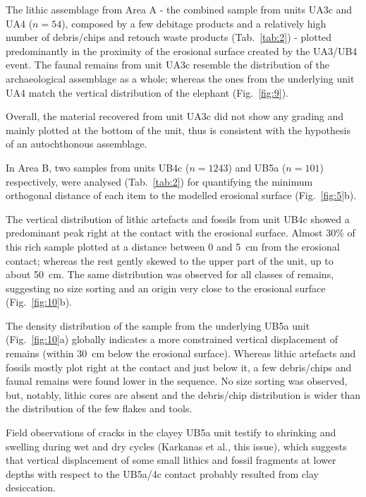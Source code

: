 \documentclass[preprint,authoryear,times]{elsarticle} %
\begin{document}
The lithic assemblage from Area A - the combined sample from units UA3c and UA4 ($n = 54$), composed by a few debitage products and a relatively high number of debris/chips and retouch waste products (Tab.~\ref{tab:2}) - plotted predominantly in the proximity of the erosional surface created by the UA3/UB4 event. The faunal remains from unit UA3c resemble the distribution of the archaeological assemblage as a whole; whereas the ones from the underlying unit UA4 match the vertical distribution of the elephant (Fig.~\ref{fig:9}).

Overall, the material recovered from unit UA3c did not show any grading and mainly plotted at the bottom of the unit, thus is consistent with the hypothesis of an autochthonous assemblage.


In Area B, two samples from units UB4c ($n = 1243$) and UB5a ($n = 101$) respectively, were analysed (Tab.~\ref{tab:2}) for quantifying the minimum orthogonal distance of each item to the modelled erosional surface (Fig.~\ref{fig:5}b).

The vertical distribution of lithic artefacts and fossils from unit UB4c showed a predominant peak right at the contact with the erosional surface. Almost 30\% of this rich sample plotted at a distance between 0 and 5~cm from the erosional contact; whereas the rest gently skewed to the upper part of the unit, up to about 50~cm. The same distribution was observed for all classes of remains, suggesting no size sorting and an origin very close to the erosional surface (Fig.~\ref{fig:10}b).

The density distribution of the sample from the underlying UB5a unit (Fig.~\ref{fig:10}a) globally indicates a more constrained vertical displacement of remains (within 30~cm below the erosional surface). Whereas lithic artefacts and fossils mostly plot right at the contact and just below it, a few debris/chips and faunal remains were found lower in the sequence. No size sorting was observed, but, notably, lithic cores are absent and the debris/chip distribution is wider than the distribution of the few flakes and tools.

Field observations of cracks in the clayey UB5a unit testify to shrinking and swelling during wet and dry cycles (Karkanas et al., this issue), which suggests that vertical displacement of some small lithics and fossil fragments at lower depths with respect to the UB5a/4c contact probably resulted from clay desiccation.
\end{document}
